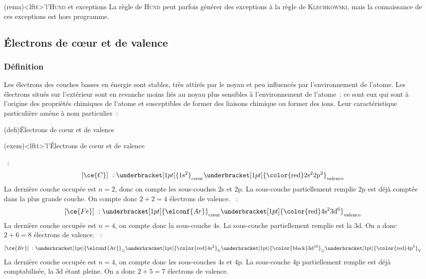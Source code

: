 \documentclass[../../main/main.tex]{subfiles}
\begin{document}
\begin{tcb*}(rema)<lftt>'l'{\textsc{Hund} et exceptions}
	La règle de \textsc{Hund} peut parfois générer des exceptions à la règle de
	\textsc{Klechkowski}, mais la connaissance de ces exceptions est hors
	programme.
\end{tcb*}

\subsection{Électrons de cœur et de valence}
\subsubsection{Définition}

Les électrons des couches basses en énergie sont stables, très attirés par le
noyau et peu influencés par l'environnement de l'atome. Les électrons situés sur
l'extérieur sont en revanche moins liés au noyau plus sensibles à
l'environnement de l'atome~: ce sont eux qui sont à l'origine des propriétés
chimiques de l'atome et susceptibles de former des liaisons chimique ou former
des ions. Leur caractéristique particulière amène à nom particulier~:

\begin{tcb*}(defi){Électrons de cœur et de valence}
\end{tcb*}

\begin{tcb*}(exem)<lftt>'l'{Électrons de cœur et de valence}
	\begin{itemize}[label=$\diamond$, leftmargin=20pt]
		~:
		\[[\ce{C}]~:
			\underbracket[1pt]{\strut \rm 1s^2}_{\text{cœur}}
			\underbracket[1pt]{\strut \rm \color{red}2s^22p^2}_{\text{valence}}\]
		La dernière couche occupée est $n=2$, donc on compte les
		sous-couches 2s et 2p. La sous-couche partiellement
		remplie 2p est déjà comptée dans la plus grande couche. On compte
		donc $2+2=4$ électrons de valence.
		~:
		\[[\ce{Fe}]~:
			\underbracket[1pt]{\strut \elconf{Ar}}_{\text{cœur}}
			\underbracket[1pt]{\strut \rm \color{red}4s^23d^6}_{\text{valence}}\]
		La dernière couche occupée est $n=4$, on compte donc la sous-couche
		4s. La sous-couche partiellement remplie est la 3d. On a donc $2+6 =
			8$ électrons de valence.
		~:
		\[[\ce{Br}]~: \rm
			\underbracket[1pt]{\strut \elconf{Ar}}_{\heartsuit}
			\underbracket[1pt]{\strut \rm \color{red}4s^2}_{\rm V}
			\underbracket[1pt]{\strut \rm \color{black}3d^{10}}_{\heartsuit}
			\underbracket[1pt]{\strut \rm \color{red}4p^5}_{\rm V}\]
		La dernière couche occupée est $n=4$, on compte donc les
		sous-couches 4s et 4p. La sous-couche 4p partiellement remplie est
		déjà comptabilisée, la 3d étant pleine. On a donc $2+5=7$ électrons
		de valence.
	\end{itemize}
\end{tcb*}
\end{document}
